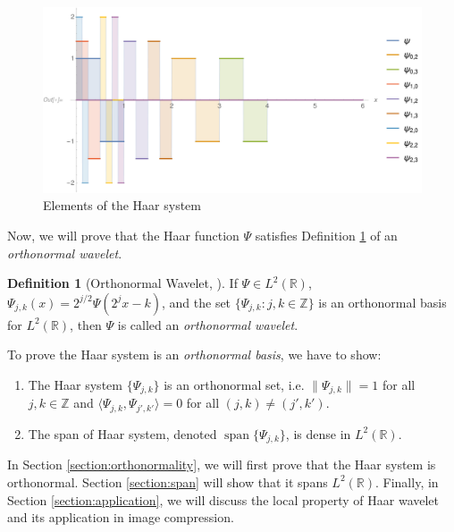 \documentclass[11pt]{amsart}
\theoremstyle{theorem} %
\theoremstyle{definition}
\newtheorem{defn}[thm]{Definition}
\theoremstyle{example}
\theoremstyle{remark}
\numberwithin{equation}{section}
\newcommand{\R}{\mathbb{R}}
\newcommand{\Z}{\mathbb{Z}}
\DeclareMathOperator{\spn}{span}
\begin{document}
\begin{figure}[h]
	\centering
	\includegraphics[width=1\linewidth]{img/haar_system2}
	\caption[Elements of the Haar system]{Elements of the Haar system}
	\label{fig:haarsystem}
\end{figure}
	
Now, we will prove that the Haar function $ \varPsi $ satisfies Definition \ref{def:wavelet} of an \emph{orthonormal wavelet}.

\begin{defn}[Orthonormal Wavelet, {\cite[303]{pinsky}}] \label{def:wavelet}
	If $ \varPsi \in L^2(\R) $, $ \varPsi_{j,k}(x) = 2^{j/2} \varPsi (2^j x-k) $, and the set $ \{ \varPsi_{j,k}: j,k \in \Z \} $ is an orthonormal basis for $ L^2(\R) $, then $ \varPsi $ is called an \emph{orthonormal wavelet}.
\end{defn}

To prove the Haar system is an \textit{orthonormal basis}, we have to show:
	\begin{enumerate}
		\item The Haar system $ \{ \varPsi_{j,k} \} $ is an orthonormal set, i.e. $ \| \varPsi_{j,k} \| = 1 $ for all $ j,k \in \Z $ and $ \langle \varPsi_{j,k}, \varPsi_{j',k'} \rangle = 0 $ for all $ (j,k) \neq (j',k') $.
		
		\item The span of Haar system, denoted $ \spn\{\varPsi_{j,k}\} $, is dense in $ L^2(\R) $.
	\end{enumerate}

In Section \ref{section:orthonormality}, we will first prove that the Haar system is orthonormal. Section \ref{section:span} will show that it spans $ L^2(\R) $. Finally, in Section \ref{section:application}, we will discuss the local property of Haar wavelet and its application in image compression.
\end{document}
